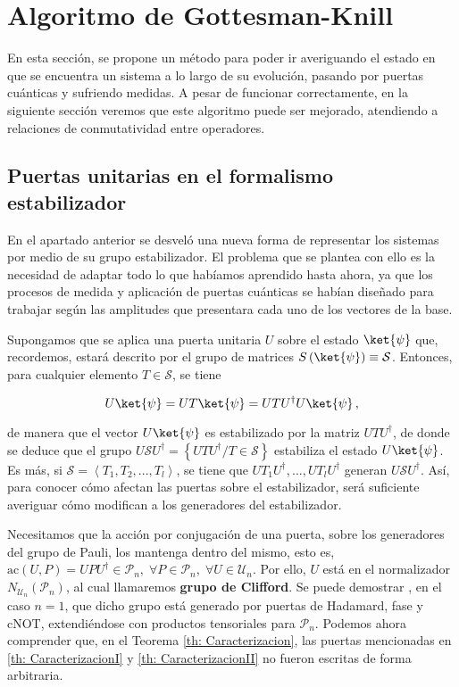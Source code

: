 \documentclass[11pt,a4paper,twoside,pdf]{article}
\numberwithin{equation}{section}
\begin{document}
\newpage

\section{Algoritmo de Gottesman-Knill}	\label{sec: GottesmanKnill}

En esta sección, se propone un método para poder ir averiguando el estado en que se encuentra un sistema a lo largo de su evolución, pasando por puertas cuánticas y sufriendo medidas. A pesar de funcionar correctamente, en la siguiente sección veremos que este algoritmo puede ser mejorado, atendiendo a relaciones de conmutatividad entre operadores.
	
		\subsection{Puertas unitarias en el formalismo estabilizador} 
			\label{subsec: puertas}
		
		En el apartado anterior se desveló una nueva forma de representar los sistemas por medio de su grupo estabilizador. El problema que se plantea con ello es la necesidad de adaptar todo lo que habíamos aprendido hasta ahora, ya que los procesos de medida y aplicación de puertas cuánticas se habían diseñado para trabajar según las amplitudes que presentara cada uno de los vectores de la base.
		
		Supongamos que se aplica una puerta unitaria $U$ sobre el estado $\ket{\psi}$ que, recordemos, estará descrito por el grupo de matrices $S\left( \ket{\psi}\right) \equiv \mathcal{S}$. Entonces, para cualquier elemento $T \in \mathcal{S} $, se tiene
		
			\begin{equation}
				U\ket{\psi} = U T\ket{\psi}=UTU^{\dagger}U\ket{\psi} \, ,
			\end{equation}  
		
		\noindent de manera que el vector $U\ket{\psi}$ es estabilizado por la matriz $UTU^{\dagger}$, de donde se deduce que el grupo $U\mathcal{S}U^{\dagger}=\left\{UTU^{\dagger} / T\in \mathcal{S} \right\}$ estabiliza el estado $U\ket{\psi}$. Es más, si $\mathcal{S}=\left< T_1,T_2,...,T_l\right> $, se tiene que $UT_1U^{\dagger},...,UT_lU^{\dagger}$ generan $U\mathcal{S}U^{\dagger}$. Así, para conocer cómo afectan las puertas sobre el estabilizador, será suficiente averiguar cómo modifican a los generadores del estabilizador.
		
		Necesitamos que la acción por conjugación de una puerta, sobre los generadores del grupo de Pauli, los mantenga dentro del mismo, esto es, $\text{ac}(U,P)=UPU^\dagger \in \mathcal{P}_n, \; \forall P\in\mathcal{P}_n,  \; \forall U\in \mathcal{U}_n$. Por ello, $U$ está en el normalizador $N_{\mathcal{U}_n}(\mathcal{P}_n)$, al cual llamaremos \textbf{grupo de Clifford}. Se puede demostrar \cite{Gottesman}, en el caso $n=1$, que dicho grupo está generado por puertas de Hadamard, fase y cNOT, extendiéndose con productos tensoriales para $\mathcal{P}_n$.
		Podemos ahora comprender que, en el Teorema \ref{th: Caracterizacion}, las puertas mencionadas en \ref{th: CaracterizacionI} y \ref{th: CaracterizacionII} no fueron escritas de forma arbitraria.
		
\end{document}
